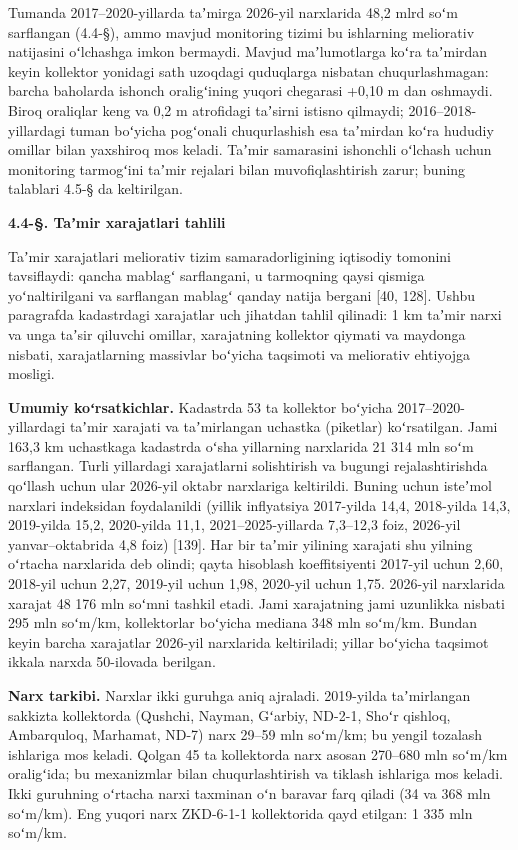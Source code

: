 \documentclass[14pt,a4paper,oneside]{extreport}
\newcommand{\oakpar}[1]{\Needspace{5\baselineskip}\phantomsection\addcontentsline{toc}{section}{#1}%
  \vspace{6pt}\begin{center}\bfseries #1\end{center}\vspace{2pt}}
\begin{document}
Tumanda 2017--2020-yillarda taʼmirga 2026-yil narxlarida 48,2 mlrd soʻm
sarflangan (4.4-§), ammo mavjud monitoring tizimi bu ishlarning
meliorativ natijasini oʻlchashga imkon bermaydi. Mavjud maʼlumotlarga
koʻra taʼmirdan keyin kollektor yonidagi sath uzoqdagi quduqlarga
nisbatan chuqurlashmagan: barcha baholarda ishonch oraligʻining yuqori
chegarasi +0,10 m dan oshmaydi. Biroq oraliqlar keng va 0,2 m atrofidagi
taʼsirni istisno qilmaydi; 2016--2018-yillardagi tuman boʻyicha
pogʻonali chuqurlashish esa taʼmirdan koʻra hududiy omillar bilan
yaxshiroq mos keladi. Taʼmir samarasini ishonchli oʻlchash uchun
monitoring tarmogʻini taʼmir rejalari bilan muvofiqlashtirish zarur;
buning talablari 4.5-§ da keltirilgan.

\oakpar{4.4-§. Taʼmir xarajatlari tahlili}

Taʼmir xarajatlari meliorativ tizim samaradorligining iqtisodiy tomonini
tavsiflaydi: qancha mablagʻ sarflangani, u tarmoqning qaysi qismiga
yoʻnaltirilgani va sarflangan mablagʻ qanday natija bergani {[}40,
128{]}. Ushbu paragrafda kadastrdagi xarajatlar uch jihatdan tahlil
qilinadi: 1 km taʼmir narxi va unga taʼsir qiluvchi omillar, xarajatning
kollektor qiymati va maydonga nisbati, xarajatlarning massivlar boʻyicha
taqsimoti va meliorativ ehtiyojga mosligi.

\textbf{Umumiy koʻrsatkichlar.} Kadastrda 53 ta kollektor boʻyicha
2017--2020-yillardagi taʼmir xarajati va taʼmirlangan uchastka
(piketlar) koʻrsatilgan. Jami 163,3 km uchastkaga kadastrda oʻsha
yillarning narxlarida 21 314 mln soʻm sarflangan. Turli yillardagi
xarajatlarni solishtirish va bugungi rejalashtirishda qoʻllash uchun
ular 2026-yil oktabr narxlariga keltirildi. Buning uchun isteʼmol
narxlari indeksidan foydalanildi (yillik inflyatsiya 2017-yilda 14,4,
2018-yilda 14,3, 2019-yilda 15,2, 2020-yilda 11,1, 2021--2025-yillarda
7,3--12,3 foiz, 2026-yil yanvar--oktabrida 4,8 foiz) {[}139{]}. Har bir
taʼmir yilining xarajati shu yilning oʻrtacha narxlarida deb olindi;
qayta hisoblash koeffitsiyenti 2017-yil uchun 2,60, 2018-yil uchun 2,27,
2019-yil uchun 1,98, 2020-yil uchun 1,75. 2026-yil narxlarida xarajat 48
176 mln soʻmni tashkil etadi. Jami xarajatning jami uzunlikka nisbati
295 mln soʻm/km, kollektorlar boʻyicha mediana 348 mln soʻm/km. Bundan
keyin barcha xarajatlar 2026-yil narxlarida keltiriladi; yillar boʻyicha
taqsimot ikkala narxda 50-ilovada berilgan.

\textbf{Narx tarkibi.} Narxlar ikki guruhga aniq ajraladi. 2019-yilda
taʼmirlangan sakkizta kollektorda (Qushchi, Nayman, Gʻarbiy, ND-2-1,
Shoʻr qishloq, Ambarquloq, Marhamat, ND-7) narx 29--59 mln soʻm/km; bu
yengil tozalash ishlariga mos keladi. Qolgan 45 ta kollektorda narx
asosan 270--680 mln soʻm/km oraligʻida; bu mexanizmlar bilan
chuqurlashtirish va tiklash ishlariga mos keladi. Ikki guruhning
oʻrtacha narxi taxminan oʻn baravar farq qiladi (34 va 368 mln soʻm/km).
Eng yuqori narx ZKD-6-1-1 kollektorida qayd etilgan: 1 335 mln soʻm/km.
\end{document}
